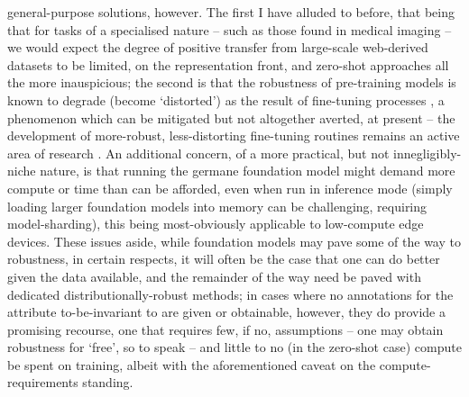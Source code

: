 general-purpose solutions, however. 
%
The first I have alluded to before, that being that for tasks of a specialised nature -- such as
those found in medical imaging -- we would expect the degree of positive transfer from large-scale
web-derived datasets to be limited, on the representation front, and zero-shot approaches all the
more inauspicious; the second is that the robustness of pre-training models is known to degrade
(become `distorted') as the result of fine-tuning processes \citep{andreassen2021evolution,
kumar2022finetuning}, a phenomenon which can be mitigated but not altogether averted, at present --
the development of more-robust, less-distorting fine-tuning routines remains an active area of
research \citep{lee2022surgical, trivedi2023closer}.
%
An additional concern, of a more practical, but not innegligibly-niche nature, is that running the
germane foundation model might demand more compute or time than can be afforded, even when run in
inference mode (simply loading larger foundation models into memory can be challenging, requiring
model-sharding), this being most-obviously applicable to low-compute edge devices.
%
These issues aside, while foundation models may pave some of the way to robustness, in certain
respects, it will often be the case that one can do better given the data available, and the
remainder of the way need be paved with dedicated distributionally-robust methods; in cases where
no annotations for the attribute to-be-invariant to are given or obtainable, however, they do
provide a promising recourse, one that requires few, if no, assumptions -- one may obtain
robustness for `free', so to speak -- and little to no (in the zero-shot case) compute be spent on
training, albeit with the aforementioned caveat on the compute-requirements standing.


%

